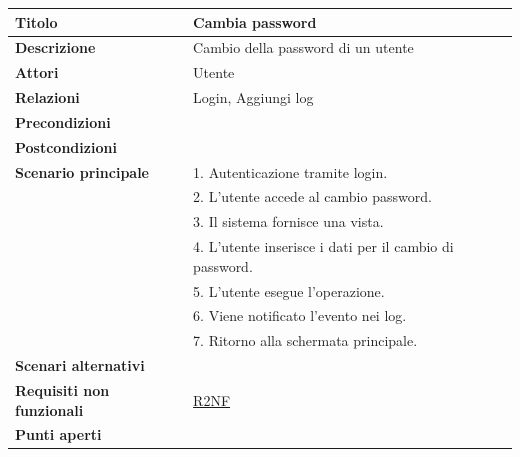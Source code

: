 \documentclass[a4paper]{article}
\begin{document}
  \begin{center}
    \begin{tabularx}{1\textwidth}{l|X}
        \textbf{Titolo} & Cambia password \\
        \hline
        \textbf{Descrizione} & Cambio della password di un utente \\
        \hline
        \textbf{Attori} & Utente \\
        \hline
        \textbf{Relazioni} & Login, Aggiungi log \\
        \hline
        \textbf{Precondizioni} &  \\
        \hline
        \textbf{Postcondizioni} &  \\
        \hline
        \textbf{Scenario principale} & 1. Autenticazione tramite login. \\
                                     & 2. L'utente accede al cambio password. \\
                                     & 3. Il sistema fornisce una vista. \\
                                     & 4. L'utente inserisce i dati per il cambio di password. \\
                                     & 5. L'utente esegue l'operazione.\\
                                     & 6. Viene notificato l'evento nei log.\\
                                     & 7. Ritorno alla schermata principale.\\
        \hline
        \textbf{Scenari alternativi} & \\
        \hline
        \textbf{Requisiti non funzionali} & \hyperlink{R2NF}{R2NF} \\
        \hline
        \textbf{Punti aperti} & \\
        \hline
    \end{tabularx}
  \end{center}



\end{document}
